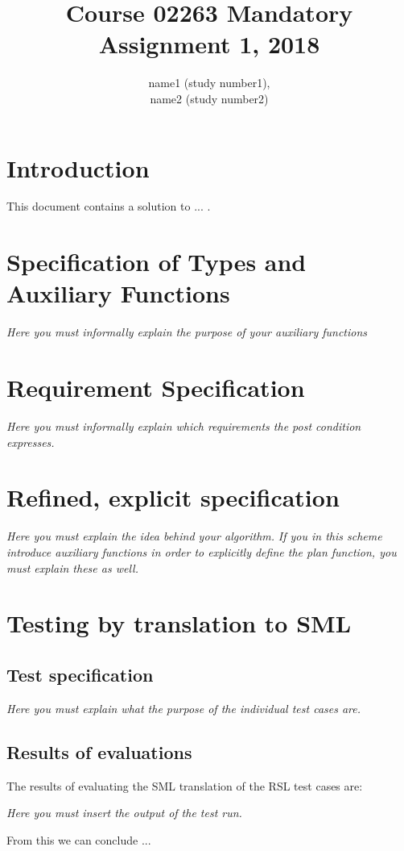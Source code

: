 \documentclass[a4]{article}
\title{Course 02263 Mandatory Assignment 1, 2018}
\author{name1 (study number1),\\ 
        name2 (study number2)}
\begin{document}
\maketitle

\tableofcontents
\newpage

\section{Introduction}
This document contains a solution to ... . 

\section{Specification of Types and Auxiliary Functions}


  

{\em Here you must informally explain the purpose of your auxiliary functions}

\section{Requirement Specification}

  

{\em Here you must informally explain which requirements the post
  condition expresses.}

\section{Refined, explicit specification}

  

{\em Here you must  explain the idea behind your algorithm.}
{\em If you in this scheme introduce auxiliary functions in order to explicitly
  define the plan function, you must explain these as well.}

\section{Testing by translation to SML}

\subsection{Test specification}


        
{\em Here you must  explain what the purpose of the individual test
  cases are.}


\subsection{Results of evaluations}


The results of evaluating the SML translation of the RSL test cases are:

{\em Here you must  insert the output of the test run.}



\noindent From this we can conclude ...
\end{document}
